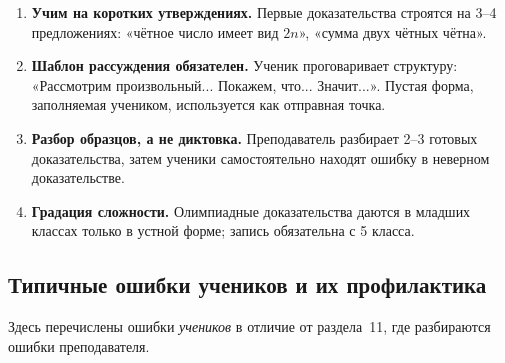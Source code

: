 \documentclass[12pt,a4paper]{article}
\begin{document}
\begin{enumerate}
  \item \textbf{Учим на коротких утверждениях.} Первые доказательства
  строятся на 3--4 предложениях: «чётное число имеет вид $2n$»,
  «сумма двух чётных чётна».
  \item \textbf{Шаблон рассуждения обязателен.} Ученик проговаривает
  структуру: «Рассмотрим произвольный... Покажем, что... Значит...».
  Пустая форма, заполняемая учеником, используется как
  отправная точка.
  \item \textbf{Разбор образцов, а не диктовка.} Преподаватель
  разбирает 2--3 готовых доказательства, затем ученики
  самостоятельно находят ошибку в неверном доказательстве.
  \item \textbf{Градация сложности.} Олимпиадные доказательства
  даются в младших классах только в устной форме; запись
  обязательна с 5 класса.
\end{enumerate}

\subsection{Типичные ошибки учеников и их профилактика}

Здесь перечислены ошибки \emph{учеников} в отличие от раздела~11,
где разбираются ошибки преподавателя.
\end{document}

